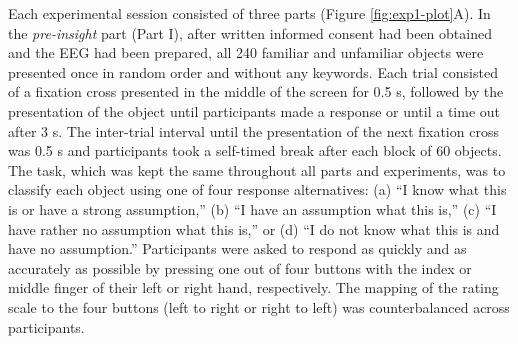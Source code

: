 \documentclass[
  english,
  man,11pt,floatsintext]{apa7}
\begin{document}
Each experimental session consisted of three parts (Figure \ref{fig:exp1-plot}A). In the \emph{pre-insight} part (Part I), after written informed consent had been obtained and the EEG had been prepared, all 240 familiar and unfamiliar objects were presented once in random order and without any keywords. Each trial consisted of a fixation cross presented in the middle of the screen for 0.5 s, followed by the presentation of the object until participants made a response or until a time out after 3 s. The inter-trial interval until the presentation of the next fixation cross was 0.5 s and participants took a self-timed break after each block of 60 objects. The task, which was kept the same throughout all parts and experiments, was to classify each object using one of four response alternatives: (a) \enquote{I know what this is or have a strong assumption,} (b) \enquote{I have an assumption what this is,} (c) \enquote{I have rather no assumption what this is,} or (d) \enquote{I do not know what this is and have no assumption.} Participants were asked to respond as quickly and as accurately as possible by pressing one out of four buttons with the index or middle finger of their left or right hand, respectively. The mapping of the rating scale to the four buttons (left to right or right to left) was counterbalanced across participants.
\end{document}
